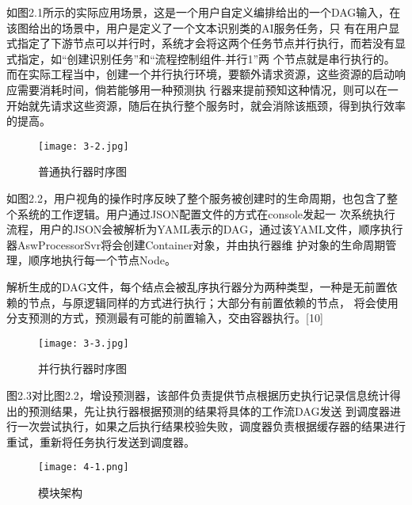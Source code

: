 如图2.1所示的实际应用场景，这是一个用户自定义编排给出的一个DAG输入，在该图给出的场景中，用户是定义了一个文本识别类的AI服务任务，只
有在用户显式指定了下游节点可以并行时，系统才会将这两个任务节点并行执行，而若没有显式指定，如“创建识别任务”和“流程控制组件-并行1”两
个节点就是串行执行的。而在实际工程当中，创建一个并行执行环境，要额外请求资源，这些资源的启动响应需要消耗时间，倘若能够用一种预测执
行器来提前预知这种情况，则可以在一开始就先请求这些资源，随后在执行整个服务时，就会消除该瓶颈，得到执行效率的提高。



\begin{figure}[H]
    \centering
    \texttt{[image: 3-2.jpg]}
    \caption{普通执行器时序图}
    \label{fig:普通执行器时序图}
\end{figure}

如图2.2，用户视角的操作时序反映了整个服务被创建时的生命周期，也包含了整个系统的工作逻辑。用户通过JSON配置文件的方式在console发起一
次系统执行流程，用户的JSON会被解析为YAML表示的DAG，通过该YAML文件，顺序执行器AswProcessorSvr将会创建Container对象，并由执行器维
护对象的生命周期管理，顺序地执行每一个节点Node。

解析生成的DAG文件，每个结点会被乱序执行器分为两种类型，一种是无前置依赖的节点，与原逻辑同样的方式进行执行；大部分有前置依赖的节点，
将会使用分支预测的方式，预测最有可能的前置输入，交由容器执行。[10]

\begin{figure}[H]
    \centering
    \texttt{[image: 3-3.jpg]}
    \caption{并行执行器时序图}
    \label{fig:并行执行器时序图}
\end{figure}

图2.3对比图2.2，增设预测器，该部件负责提供节点根据历史执行记录信息统计得出的预测结果，先让执行器根据预测的结果将具体的工作流DAG发送
到调度器进行一次尝试执行，如果之后执行结果校验失败，调度器负责根据缓存器的结果进行重试，重新将任务执行发送到调度器。


\begin{figure}[H]
    \centering
    \texttt{[image: 4-1.png]}
    \caption{模块架构}
    \label{fig:模块架构}
\end{figure}


